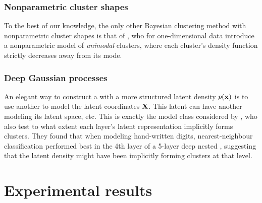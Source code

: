 
\subsubsection{Nonparametric cluster shapes}

To the best of our knowledge, the only other Bayesian clustering method with nonparametric cluster shapes is that of \citet{rodriguez2012univariate}, who for one-dimensional data introduce a nonparametric model of \emph{unimodal} clusters, where each cluster's density function strictly decreases away from its mode.


\subsubsection{Deep Gaussian processes}

An elegant way to construct a \gplvm{} with a more structured latent density $p({\bf{x}})$ is to use another \gplvm{} to model the latent coordinates $\mathbf{X}$.
This latent \gplvm{} can have another \gplvm{} modeling its latent space, etc.
This is exactly the model class considered by \citet{damianou2012deep}, who also test to what extent each layer's latent representation implicitly forms clusters.
They found that when modeling \MNIST{} hand-written digits, nearest-neighbour classification performed best in the 4th layer of a 5-layer deep nested \gplvm{}, suggesting that the latent density might have  been implicitly forming clusters at that level.


\section{Experimental results}
\label{sec:iwmm-experiments}

